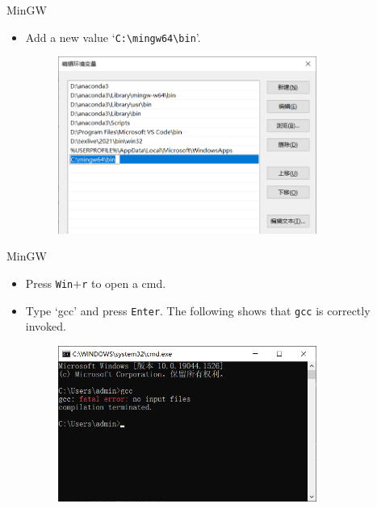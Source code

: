 \documentclass[handout]{beamer}
\begin{document}
\begin{frame}{MinGW}
    \begin{itemize}
        \item Add a new value `\texttt{C:\textbackslash mingw64\textbackslash bin}'.
        \begin{figure}[h]
            \centering
            \includegraphics[width=0.8\textwidth]{img/added.png}
        \end{figure}
    \end{itemize}
\end{frame}

\begin{frame}{MinGW}
    \begin{itemize}
        \item Press \texttt{Win}\(+\)\texttt{r} to open a cmd.
        \item Type `gcc' and press \texttt{Enter}. The following shows that \texttt{gcc} is correctly invoked.
        \begin{figure}[h]
            \centering
            \includegraphics[width=0.8\textwidth]{img/cmd_gcc.png}
        \end{figure}
    \end{itemize}
\end{frame}
\end{document}
